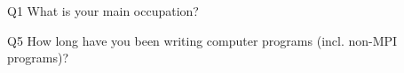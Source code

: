 \begin{description}%
\item{Q1} What is your main occupation?%
\item{Q5} How long have you been writing computer programs (incl. non-MPI programs)?%
\end{description}%
